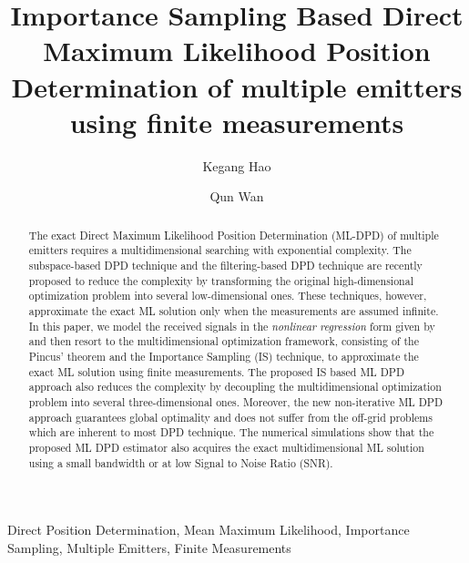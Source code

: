\documentclass[review]{elsarticle}
\begin{document}
\begin{frontmatter}

\title{Importance Sampling Based Direct Maximum Likelihood Position Determination of multiple emitters using finite measurements}
\author{Kegang Hao}
\author{Qun Wan} 
\address{School of Information and Communication Engineering, University of Electronic Science and Technology of China}

\begin{abstract}
The exact Direct Maximum Likelihood Position Determination (ML-DPD) of multiple emitters requires a multidimensional searching with exponential complexity. The subspace-based DPD technique \cite{DPD2005} and the filtering-based DPD technique \cite{2004Direct,Tirer2015High} are recently proposed to reduce the complexity by transforming the original high-dimensional optimization problem into several low-dimensional ones. These techniques, however, approximate the exact ML solution only when the measurements are assumed infinite. In this paper, we model the received signals in the \emph{nonlinear regression} form given by \cite{Kay2000Mean} and then resort to the multidimensional optimization framework, consisting of the Pincus' theorem and the Importance Sampling (IS) technique, to approximate the exact ML solution using finite measurements. The proposed IS based ML DPD approach also reduces the complexity by decoupling the multidimensional optimization problem into several three-dimensional ones. Moreover, the new non-iterative ML DPD approach guarantees global optimality and does not suffer from the off-grid problems which are inherent to most DPD technique. The numerical simulations show that the proposed ML DPD estimator also acquires the exact multidimensional ML solution using a small bandwidth or at low Signal to Noise Ratio (SNR).
\end{abstract}

\begin{keyword}
Direct Position Determination, Mean Maximum Likelihood, Importance Sampling, Multiple Emitters, Finite Measurements
\end{keyword}

\end{frontmatter}
\end{document}
